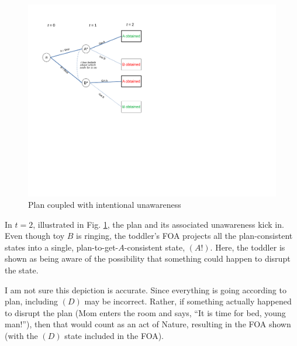 \documentclass[
11pt,
titlepage,
reqno,
]{article}%
\theoremstyle{definition}
\begin{document}
\begin{figure}[h!]
	\centering
	\includegraphics*[page=19,trim = 0in 4in 1in 0in,scale=.65]{Awareness_Diagrams_All}
	\caption{Plan coupled with intentional unawareness\label{Diag: p-19}}%
\end{figure}

In $t=2$, illustrated in Fig. \ref{Diag: p-19}, the plan and its associated unawareness kick in. Even though toy $B$ is ringing, the toddler's FOA projects all the plan-consistent states into a single, plan-to-get-$A$-consistent state, $(A!)$. Here, the toddler is shown as being aware of the possibility that something could happen to disrupt the state. 

I am not sure this depiction is accurate. Since everything is going according to plan, including $(D)$ may be incorrect. Rather, if something actually happened to disrupt the plan (Mom enters the room and says, ``It is time for bed, young man!''), then that would count as an act of Nature, resulting in the FOA shown (with the $(D)$ state included in the FOA). 
\end{document}
